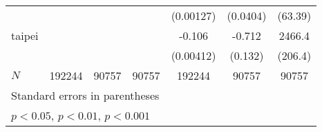 {\begin{tabular}{l*{6}{c}}
            &                     &                     &                     &   (0.00127)         &    (0.0404)         &     (63.39)         \\
[1em]
taipei      &                     &                     &                     &      -0.106\sym{***}&      -0.712\sym{***}&      2466.4\sym{***}\\
            &                     &                     &                     &   (0.00412)         &     (0.132)         &     (206.4)         \\
\hline
\(N\)       &      192244         &       90757         &       90757         &      192244         &       90757         &       90757         \\
\hline\hline
\multicolumn{7}{l}{\footnotesize Standard errors in parentheses}\\
\multicolumn{7}{l}{\footnotesize \sym{*} \(p<0.05\), \sym{**} \(p<0.01\), \sym{***} \(p<0.001\)}\\
\end{tabular}
}
